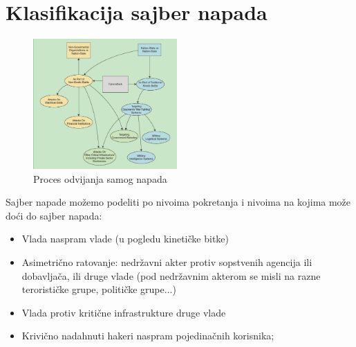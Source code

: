 \documentclass[a4paper]{article}
\begin{document}
{\section{Klasifikacija sajber napada}
\label{sec:naslovN}

\begin{figure}[h!]
  \centering
  \begin{center}
  \includegraphics[width=55mm]{proces.jpg}
  \end{center}
  \caption{Proces odvijanja samog napada}
  \label{fig:vr1}
\end{figure}

Sajber napade možemo podeliti po nivoima pokretanja i nivoima na kojima može doći do sajber napada:
\begin{itemize}
    \item Vlada naspram vlade (u pogledu kinetičke bitke)
    \item Asimetrično ratovanje: nedržavni akter protiv sopstvenih agencija ili dobavljača, ili druge vlade (pod nedržavnim akterom se misli na razne terorističke grupe, političke grupe...)
    \item Vlada protiv kritične infrastrukture druge vlade
    \item  Krivično nadahnuti hakeri naspram pojedinačnih korisnika;
\end{itemize}



}
\end{document}

